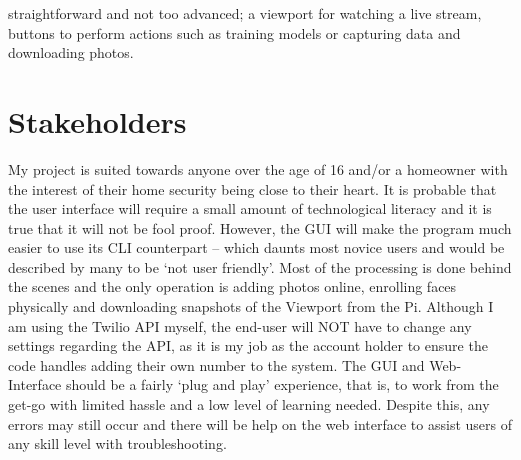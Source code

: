 \documentclass[9pt]{article}
\begin{document}
straightforward and not too advanced; a viewport for watching a live stream, buttons to perform actions such as training models or capturing data and downloading photos.

\section{Stakeholders}\label{sec_stakeholders}
My project is suited towards anyone over the age of 16 and/or a homeowner with the interest of their home security being close to their heart. It is probable that the user interface will require a small amount of technological literacy and it is true that it will not be fool proof. However, the GUI will make the program much easier to use its CLI counterpart – which daunts most novice users and would be described by many to be ‘not user friendly’. Most of the processing is done behind the scenes and the only operation is adding photos online, enrolling faces physically and downloading snapshots of the Viewport from the Pi. Although I am using the Twilio API myself, the end-user will NOT have to change any settings regarding the API, as it is my job as the account holder to ensure the code handles adding their own number to the system. The GUI and Web-Interface should be a fairly ‘plug and play’ experience, that is, to work from the get-go with limited hassle and a low level of learning needed. Despite this, any errors may still occur and there will be help on the web interface to assist users of any skill level with troubleshooting.
\end{document}
